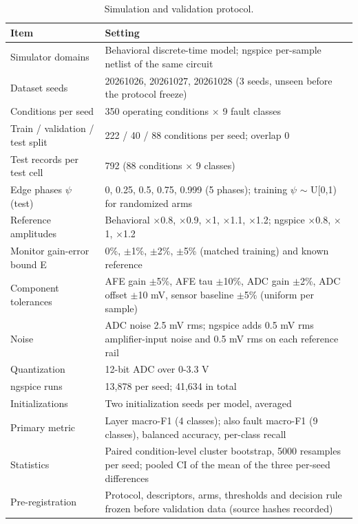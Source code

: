 \begin{table}[H]
\caption{Simulation and validation protocol.\label{tab:table03_protocol}}
\centering
\footnotesize
\begin{tabular}{p{3.2cm}p{10.8cm}}
\toprule
\textbf{Item} & \textbf{Setting} \\
\midrule
Simulator domains & Behavioral discrete-time model; ngspice per-sample netlist of the same circuit \\
Dataset seeds & 20261026, 20261027, 20261028 (3 seeds, unseen before the protocol freeze) \\
Conditions per seed & 350 operating conditions $\times$ 9 fault classes \\
Train / validation / test split & 222 / 40 / 88 conditions per seed; overlap 0 \\
Test records per test cell & 792 (88 conditions $\times$ 9 classes) \\
Edge phases $\psi$ (test) & 0, 0.25, 0.5, 0.75, 0.999 (5 phases); training $\psi$ $\sim$ U[0,1) for randomized arms \\
Reference amplitudes & Behavioral $\times$0.8, $\times$0.9, $\times$1, $\times$1.1, $\times$1.2; ngspice $\times$0.8, $\times$1, $\times$1.2 \\
Monitor gain-error bound E & 0\%, $\pm$1\%, $\pm$2\%, $\pm$5\% (matched training) and known reference \\
Component tolerances & AFE gain $\pm$5\%, AFE tau $\pm$10\%, ADC gain $\pm$2\%, ADC offset $\pm$10 mV, sensor baseline $\pm$5\% (uniform per sample) \\
Noise & ADC noise 2.5 mV rms; ngspice adds 0.5 mV rms amplifier-input noise and 0.5 mV rms on each reference rail \\
Quantization & 12-bit ADC over 0-3.3 V \\
ngspice runs & 13,878 per seed; 41,634 in total \\
Initializations & Two initialization seeds per model, averaged \\
Primary metric & Layer macro-F1 (4 classes); also fault macro-F1 (9 classes), balanced accuracy, per-class recall \\
Statistics & Paired condition-level cluster bootstrap, 5000 resamples per seed; pooled CI of the mean of the three per-seed differences \\
Pre-registration & Protocol, descriptors, arms, thresholds and decision rule frozen before validation data (source hashes recorded) \\
\bottomrule
\end{tabular}
\par\vspace{2pt}
\end{table}

